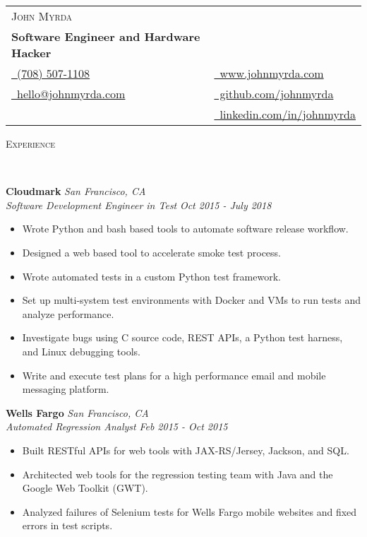 \documentclass{article}
\newenvironment{changemargin}[2]{%
  \begin{list}{}{%
    \setlength{\topsep}{0pt}%
    \setlength{\leftmargin}{#1}%
    \setlength{\rightmargin}{#2}%
    \setlength{\listparindent}{\parindent}%
    \setlength{\itemindent}{\parindent}%
    \setlength{\parsep}{\parskip}%
  }%
  \item[]}{\end{list}
}
\newcommand{\lineover}{
	\begin{changemargin}{-0.05in}{-0.05in}
		\vspace*{-8pt}
		\hrulefill \\
		\vspace*{-2pt}
	\end{changemargin}
}
\newcommand{\header}[1]{
	\begin{changemargin}{-0.5in}{-0.5in}
		\scshape{#1}\\
  	\lineover
	\end{changemargin}
}
\newcommand{\contact}[7]{
	\begin{changemargin}{-0.5in}{-0.5in}
		\begin{tabular}{l l}
			\Large \scshape {#1}\\
			\textbf{#2}\\
			{#3} & {#5}\\ 
			{#4} & {#6}\\
			 & {#7}\\
		\end{tabular}
	\end{changemargin}
}
\newenvironment{body} {
	\vspace*{-16pt}
	\begin{changemargin}{-0.25in}{-0.5in}
  }	
	{\end{changemargin}
}
\begin{document}
\contact{John Myrda}
{Software Engineer and Hardware Hacker}
{\href{tel:7085071108}{\faPhone\ (708) 507-1108}}
{\href{mailto:hello@johnmyrda.com}{\faEnvelope\ hello@johnmyrda.com}}
{\href{https://www.johnmyrda.com}{\faLink\ www.johnmyrda.com}}
{\href{https://github.com/johnmyrda/resume}{\faGithub\ github.com/johnmyrda}}
{\href{https://www.linkedin.com/in/johnmyrda}{\faLinkedin\ linkedin.com/in/johnmyrda}}




\header{Experience}


\begin{body}

	\vspace{20pt}
	\textbf{Cloudmark} \hfill \emph{San Francisco, CA}\\
	\emph{Software Development Engineer in Test} \hfill \emph{Oct 2015 - July 2018}\\
	\begin{itemize} \itemsep -0pt  %
	    \item Wrote Python and bash based tools to automate software release workflow.
		\item Designed a web based tool to accelerate smoke test process.
		\item Wrote automated tests in a custom Python test framework.
		\item Set up multi-system test environments with Docker and VMs to run tests and analyze performance.
\item Investigate bugs using C source code, REST APIs, a Python test harness, and Linux debugging tools.
		\item Write and execute test plans for a high performance email and mobile messaging platform.
	\end{itemize}

	\textbf{Wells Fargo} \hfill \emph{San Francisco, CA}\\
	\emph{Automated Regression Analyst} \hfill \emph{Feb 2015 - Oct 2015}\\
	\begin{itemize} \itemsep -0pt  %
		\item Built RESTful APIs for web tools with JAX-RS/Jersey, Jackson, and SQL.
		\item Architected web tools for the regression testing team with Java and the Google Web Toolkit (GWT).
		\item Analyzed failures of Selenium tests for Wells Fargo mobile websites and fixed errors in test scripts.	
	\end{itemize}


\end{body}
\end{document}
